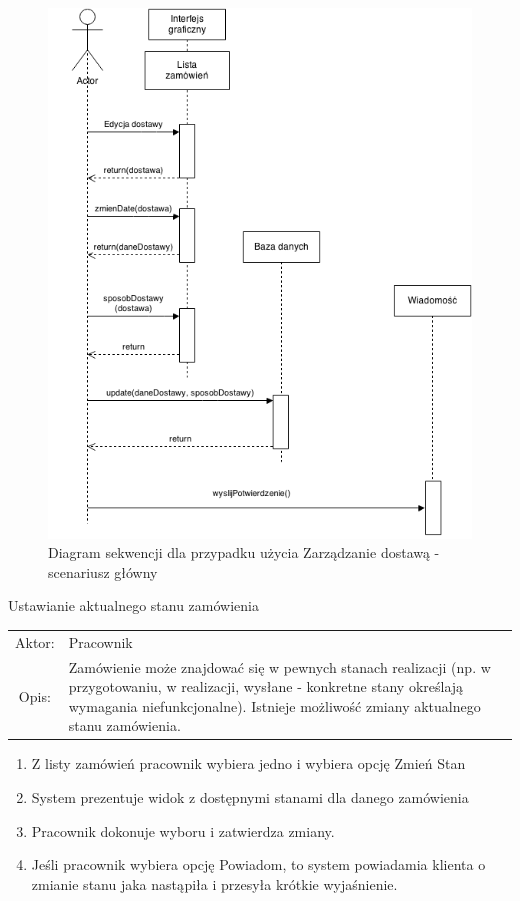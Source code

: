 	\begin{figure}[H]
    \includegraphics[width=\textwidth,
    height=0.5\textheight]{graphics/UseCase/Zamowienia/ZarzadzanieDostawaSD.png}
    \caption{Diagram sekwencji dla przypadku użycia Zarządzanie dostawą
    - scenariusz główny}
\end{figure}
	

  \item Ustawianie aktualnego stanu zamówienia\\
  \begin{tabularx}{\linewidth}{c X}
  Aktor: & Pracownik \\
  Opis: & Zamówienie może znajdować się w pewnych stanach realizacji (np. w
  przygotowaniu, w realizacji, wysłane - konkretne stany określają wymagania
  niefunkcjonalne). Istnieje możliwość zmiany aktualnego stanu zamówienia.
  \end{tabularx}
	\begin{enumerate}
	  \item Z listy zamówień pracownik wybiera jedno i wybiera opcję Zmień Stan
	  \item System prezentuje widok z dostępnymi stanami dla danego zamówienia
	  \item Pracownik dokonuje wyboru i zatwierdza zmiany.
	  \item Jeśli pracownik wybiera opcję Powiadom, to system powiadamia klienta o
	  zmianie stanu jaka nastąpiła i przesyła krótkie wyjaśnienie.
	\end{enumerate}
	 
